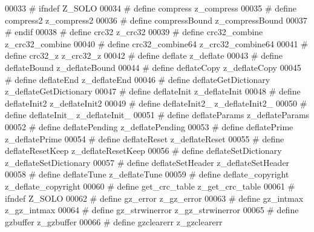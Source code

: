 \begin{DoxyCode}
00033 \textcolor{preprocessor}{#  ifndef Z\_SOLO}
00034 \textcolor{preprocessor}{#    define compress              z\_compress}
00035 \textcolor{preprocessor}{#    define compress2             z\_compress2}
00036 \textcolor{preprocessor}{#    define compressBound         z\_compressBound}
00037 \textcolor{preprocessor}{#  endif}
00038 \textcolor{preprocessor}{#  define crc32                 z\_crc32}
00039 \textcolor{preprocessor}{#  define crc32\_combine         z\_crc32\_combine}
00040 \textcolor{preprocessor}{#  define crc32\_combine64       z\_crc32\_combine64}
00041 \textcolor{preprocessor}{#  define crc32\_z               z\_crc32\_z}
00042 \textcolor{preprocessor}{#  define deflate               z\_deflate}
00043 \textcolor{preprocessor}{#  define deflateBound          z\_deflateBound}
00044 \textcolor{preprocessor}{#  define deflateCopy           z\_deflateCopy}
00045 \textcolor{preprocessor}{#  define deflateEnd            z\_deflateEnd}
00046 \textcolor{preprocessor}{#  define deflateGetDictionary  z\_deflateGetDictionary}
00047 \textcolor{preprocessor}{#  define deflateInit           z\_deflateInit}
00048 \textcolor{preprocessor}{#  define deflateInit2          z\_deflateInit2}
00049 \textcolor{preprocessor}{#  define deflateInit2\_         z\_deflateInit2\_}
00050 \textcolor{preprocessor}{#  define deflateInit\_          z\_deflateInit\_}
00051 \textcolor{preprocessor}{#  define deflateParams         z\_deflateParams}
00052 \textcolor{preprocessor}{#  define deflatePending        z\_deflatePending}
00053 \textcolor{preprocessor}{#  define deflatePrime          z\_deflatePrime}
00054 \textcolor{preprocessor}{#  define deflateReset          z\_deflateReset}
00055 \textcolor{preprocessor}{#  define deflateResetKeep      z\_deflateResetKeep}
00056 \textcolor{preprocessor}{#  define deflateSetDictionary  z\_deflateSetDictionary}
00057 \textcolor{preprocessor}{#  define deflateSetHeader      z\_deflateSetHeader}
00058 \textcolor{preprocessor}{#  define deflateTune           z\_deflateTune}
00059 \textcolor{preprocessor}{#  define deflate\_copyright     z\_deflate\_copyright}
00060 \textcolor{preprocessor}{#  define get\_crc\_table         z\_get\_crc\_table}
00061 \textcolor{preprocessor}{#  ifndef Z\_SOLO}
00062 \textcolor{preprocessor}{#    define gz\_error              z\_gz\_error}
00063 \textcolor{preprocessor}{#    define gz\_intmax             z\_gz\_intmax}
00064 \textcolor{preprocessor}{#    define gz\_strwinerror        z\_gz\_strwinerror}
00065 \textcolor{preprocessor}{#    define gzbuffer              z\_gzbuffer}
00066 \textcolor{preprocessor}{#    define gzclearerr            z\_gzclearerr}

\end{DoxyCode}
